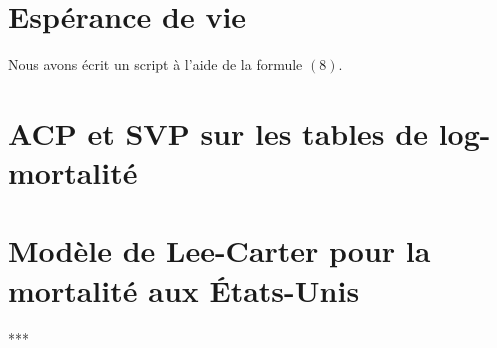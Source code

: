 \documentclass{article}
\begin{document}


\section{Espérance de vie}

\noindent Nous avons écrit un script à l'aide de la formule $(8)$.

\section{ACP et SVP sur les tables de log-mortalité}


\section{Modèle de Lee-Carter pour la mortalité aux \'Etats-Unis}







\centerline{***}

\end{document}
